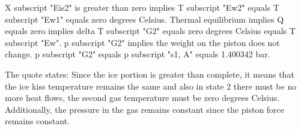 X subscript "Eis2" is greater than zero implies T subscript "Ew2" equals T subscript "Ew1" equals zero degrees Celsius. 
Thermal equilibrium implies Q equals zero implies delta T subscript "G2" equals zero degrees Celsius equals T subscript "Ew".
p subscript "G2" implies the weight on the piston does not change.
p subscript "G2" equals p subscript "s1, A" equals 1.400342 bar.

The quote states:
Since the ice portion is greater than complete, it means that the ice kiss temperature remains the same and also in state 2 there must be no more heat flows, the second gas temperature must be zero degrees Celsius. Additionally, the pressure in the gas remains constant since the piston force remains constant.